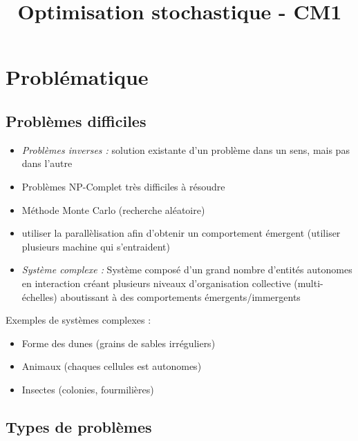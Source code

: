 \documentclass[11pt,a4paper]{article}
\title{Optimisation stochastique - CM1}
\begin{document}
	
	\maketitle
	
	\section{Problématique}
	
	\subsection{Problèmes difficiles}
	
	\begin{itemize}
		\item \textit{Problèmes inverses :} solution existante d'un problème dans un sens, mais pas dans l'autre
		\item Problèmes NP-Complet très difficiles à résoudre
		\item Méthode Monte Carlo (recherche aléatoire)
		\item utiliser la parallèlisation afin d'obtenir un comportement émergent (utiliser plusieurs machine qui s'entraident)
		\item \textit{Système complexe :} Système composé d'un grand nombre d'entités autonomes en interaction créant plusieurs niveaux d'organisation collective (multi-échelles) aboutissant à des comportements émergents/immergents
	\end{itemize}
	\vspace{1em}
	Exemples de systèmes complexes :
	\begin{itemize}
		\item Forme des dunes (grains de sables irréguliers)
		\item Animaux (chaques cellules est autonomes)
		\item Insectes (colonies, fourmilières)
	\end{itemize}
	
	
	\subsection{Types de problèmes}
	
	
	
\end{document}
